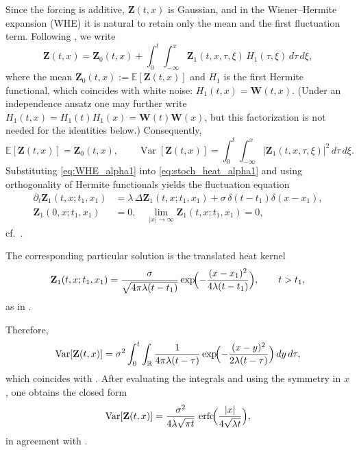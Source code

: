 \documentclass[12pt, reqno]{amsart}
\DeclareMathOperator\erfc{erfc}
\newcommand{\R}{\ensuremath{\mathbb{R}}}
\newcommand{\E}{\ensuremath{\mathbb{E}}}
\newcommand{\Var}{\ensuremath{\operatorname{Var}}}
\newcommand{\bz}{\ensuremath{\mathbf{Z}}}
\newcommand{\bw}{\ensuremath{\mathbf{W}}}
\begin{document}
Since the forcing is additive, $\bz(t,x)$ is Gaussian, and in the
Wiener--Hermite expansion (WHE) \cite{Beltagy1,Beltagy2,Beltagy3}
it is natural to retain only the mean and the first fluctuation term.
Following \cite{Beltagy1,Beltagy2,Beltagy3}, we write
\begin{equation}\label{eq:WHE_alpha1}
\bz(t,x)=\bz_0(t,x)+\int_0^t\int_{-\infty}^{x}
\bz_1(t,x,\tau,\xi)\,H_1(\tau,\xi)\,d\tau\,d\xi,
\end{equation}
where the mean $\bz_0(t,x):=\E[\bz(t,x)]$ and $H_1$ is the first Hermite functional,
which coincides with white noise:
$H_1(t,x)=\bw(t,x)$.
(Under an independence ansatz one may further write $H_1(t,x)=H_1(t)H_1(x)=\bw(t)\bw(x)$,
but this factorization is not needed for the identities below.)
Consequently,
\begin{equation}\label{eq:moments_alpha1}
\E[\bz(t,x)]=\bz_0(t,x),
\qquad
\Var[\bz(t,x)]
=\int_0^t\int_{-\infty}^{x}\bigl|\bz_1(t,x,\tau,\xi)\bigr|^2\,d\tau\,d\xi.
\end{equation}
Substituting \eqref{eq:WHE_alpha1} into \eqref{eq:stoch_heat_alpha1} and using
orthogonality of Hermite functionals yields the fluctuation equation
\begin{equation}\label{eq:fluct_alpha1}
\begin{split}
\partial_t\bz_1(t,x;t_1,x_1)
&=\lambda\,\Delta\bz_1(t,x;t_1,x_1)
+\sigma\,\delta(t-t_1)\delta(x-x_1),\\
\bz_1(0,x;t_1,x_1)&=0,\quad
\lim_{|x|\to\infty}\bz_1(t,x;t_1,x_1)=0,
\end{split}
\end{equation}
cf.\ \cite[Eq.~(4.48)]{Beltagy1}.

The corresponding particular solution is the translated heat kernel
\begin{equation}\label{eq:z1_alpha1}
\bz_1(t,x;t_1,x_1)
=
\frac{\sigma}{\sqrt{4\pi\lambda(t-t_1)}}
\exp\!\Bigl(-\frac{(x-x_1)^2}{4\lambda(t-t_1)}\Bigr),
\qquad t>t_1,
\end{equation}
as in \cite[Eq.~(4.49)]{Beltagy1}.

Therefore,
\begin{equation}\label{eq:var_int_alpha1}
\Var[\bz(t,x)]
=
\sigma^2\int_0^t\int_{\R}
\frac{1}{4\pi\lambda(t-\tau)}
\exp\!\Bigl(-\frac{(x-y)^2}{2\lambda(t-\tau)}\Bigr)\,dy\,d\tau,
\end{equation}
which coincides with \cite[Eq.~(4.50)]{Beltagy1}.
After evaluating the integrals and using the symmetry in $x$, one obtains the closed form
\begin{equation}\label{eq:var_erf_alpha1}
\Var[\bz(t,x)]
=
\frac{\sigma^{2}}{4\lambda\sqrt{\pi t}}\,
\erfc\!\Bigl(\frac{|x|}{4\sqrt{\lambda t}}\Bigr),
\end{equation}
in agreement with \cite[Eq.~(4.51)]{Beltagy1}.
\end{document}
